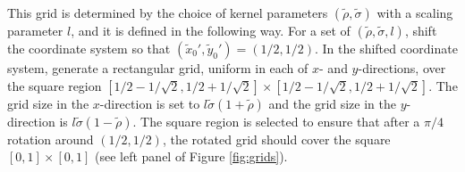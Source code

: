 This grid is determined by the choice of kernel parameters
$(\tilde{\rho}, \tilde{\sigma})$ with a scaling parameter $l$, and it
is defined in the following way. For a set of
$(\tilde{\rho}, \tilde{\sigma}, l)$, shift the coordinate system so
that $(\tilde{x}_0', \tilde{y}_0') = (1/2,1/2)$. In the shifted
coordinate system, generate a rectangular grid, uniform in each of
$x$- and $y$-directions, over the square region
$[1/2 - 1/\sqrt{2}, 1/2+1/\sqrt{2}] \times [1/2 - 1/\sqrt{2},
1/2+1/\sqrt{2}]$. The grid size in the $x$-direction is set to
$l\tilde{\sigma}(1+\tilde{\rho})$ and the grid size in the
$y$-direction is $l\tilde{\sigma}(1-\tilde{\rho})$. The square region
is selected to ensure that after a $\pi/4$ rotation around
$(1/2, 1/2)$, the rotated grid should cover the square
$[0, 1] \times [0, 1]$ (see left panel of Figure \ref{fig:grids}).

